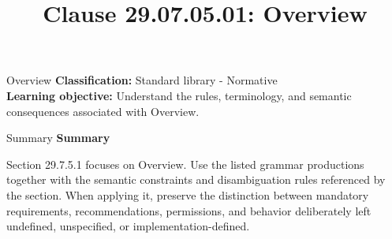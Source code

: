 \documentclass[10pt,letterpaper]{article}
\title{Clause 29.07.05.01: Overview}
\author{}
\date{}
\begin{document}
\maketitle
\begin{CornellOverviewBox}{Overview}
\textbf{Classification:} Standard library - Normative\\[2pt]
\textbf{Learning objective:} Understand the rules, terminology, and semantic consequences associated with Overview.
\end{CornellOverviewBox}\begin{CornellSummaryBox}{Summary}
{\sffamily\bfseries\color{Accent} Summary}\par\vspace{3pt}Section 29.7.5.1 focuses on Overview. Use the listed grammar productions together with the semantic constraints and disambiguation rules referenced by the section. When applying it, preserve the distinction between mandatory requirements, recommendations, permissions, and behavior deliberately left undefined, unspecified, or implementation-defined.
\end{CornellSummaryBox}
\end{document}
